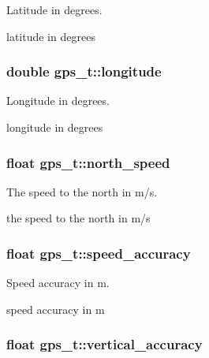 Latitude in degrees. 

latitude in degrees \hypertarget{structgps__t_ad705360e2144f17add716374c5d0395f}{
\subsubsection[{longitude}]{\setlength{\rightskip}{0pt plus 5cm}double gps\+\_\+t\+::longitude}}\label{structgps__t_ad705360e2144f17add716374c5d0395f}


Longitude in degrees. 

longitude in degrees \hypertarget{structgps__t_aa6ae22c930094f8374a745d83b8e901f}{
\subsubsection[{north\+\_\+speed}]{\setlength{\rightskip}{0pt plus 5cm}float gps\+\_\+t\+::north\+\_\+speed}}\label{structgps__t_aa6ae22c930094f8374a745d83b8e901f}


The speed to the north in m/s. 

the speed to the north in m/s \hypertarget{structgps__t_a3005316cefe45bbaf45b68d5155f49c5}{
\subsubsection[{speed\+\_\+accuracy}]{\setlength{\rightskip}{0pt plus 5cm}float gps\+\_\+t\+::speed\+\_\+accuracy}}\label{structgps__t_a3005316cefe45bbaf45b68d5155f49c5}


Speed accuracy in m. 

speed accuracy in m \hypertarget{structgps__t_a77d406fee7543f2b91f1cef1ecdb25c2}{
\subsubsection[{vertical\+\_\+accuracy}]{\setlength{\rightskip}{0pt plus 5cm}float gps\+\_\+t\+::vertical\+\_\+accuracy}}\label{structgps__t_a77d406fee7543f2b91f1cef1ecdb25c2}



